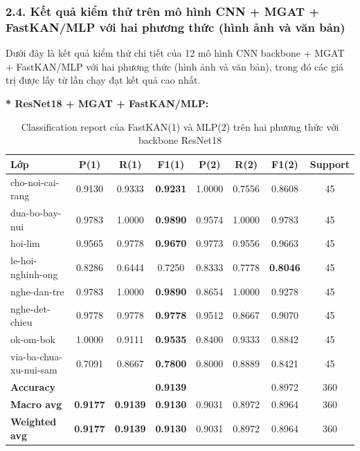 \subsubsection{2.4. Kết quả kiểm thử trên mô hình CNN + MGAT + FastKAN/MLP với hai phương thức (hình ảnh và văn bản)}
\indent\indent Dưới đây là kết quả kiểm thử chi tiết của 12 mô hình CNN backbone + MGAT + FastKAN/MLP với hai phương thức (hình ảnh và văn bản), trong đó các giá trị được lấy từ lần chạy đạt kết quả cao nhất.\vspace{0.3cm}

\textbf{* ResNet18 + MGAT + FastKAN/MLP:} 
\begin{table}[H]
\centering
\renewcommand{\arraystretch}{1.08}
\caption{\centering Classification report của FastKAN(1) và MLP(2) trên hai phương thức với backbone ResNet18}
\begin{tabular}{lccccccc}
\hline \textbf{Lớp} & \textbf{P(1)} & \textbf{R(1)} & \textbf{F1(1)} & \textbf{P(2)} & \textbf{R(2)} & \textbf{F1(2)} & \textbf{Support} \\ \hline

cho-noi-cai-rang
& 0.9130 & 0.9333 & \textbf{0.9231}
& 1.0000 & 0.7556 & 0.8608 & 45 \\

dua-bo-bay-nui
& 0.9783 & 1.0000 & \textbf{0.9890}
& 0.9574 & 1.0000 & 0.9783 & 45 \\

hoi-lim
& 0.9565 & 0.9778 & \textbf{0.9670}
& 0.9773 & 0.9556 & 0.9663 & 45 \\

le-hoi-nghinh-ong
& 0.8286 & 0.6444 & 0.7250
& 0.8333 & 0.7778 & \textbf{0.8046} & 45 \\

nghe-dan-tre
& 0.9783 & 1.0000 & \textbf{0.9890}
& 0.8654 & 1.0000 & 0.9278 & 45 \\

nghe-det-chieu
& 0.9778 & 0.9778 & \textbf{0.9778}
& 0.9512 & 0.8667 & 0.9070 & 45 \\

ok-om-bok
& 1.0000 & 0.9111 & \textbf{0.9535}
& 0.8400 & 0.9333 & 0.8842 & 45 \\

via-ba-chua-xu-nui-sam
& 0.7091 & 0.8667 & \textbf{0.7800}
& 0.8000 & 0.8889 & 0.8421 & 45 \\
\hline

\textbf{Accuracy}
& & & \textbf{0.9139}
& & & 0.8972 & 360 \\

\textbf{Macro avg}
& \textbf{0.9177} & \textbf{0.9139} & \textbf{0.9130}
& 0.9031 & 0.8972 & 0.8964 & 360 \\

\textbf{Weighted avg}
& \textbf{0.9177} & \textbf{0.9139} & \textbf{0.9130}
& 0.9031 & 0.8972 & 0.8964 & 360 \\
\hline
\end{tabular}
\end{table}

